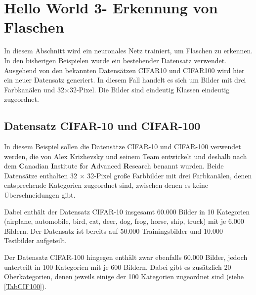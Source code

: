 %
%


\section{\glqq Hello World 3\grqq - Erkennung von Flaschen}\label{TrainFlaschen}

In diesem Abschnitt wird ein neuronales Netz trainiert, um Flaschen zu erkennen. In den bisherigen Beispielen wurde ein bestehender Datensatz verwendet. Ausgehend von den bekannten Datensätzen CIFAR10 und CIFAR100 wird hier ein neuer Datensatz generiert. In diesem Fall handelt es sich um Bilder mit drei Farbkanälen und 32$\times$32-Pixel. Die Bilder sind eindeutig Klassen eindeutig zugeordnet.  


\subsection{Datensatz CIFAR-10 und CIFAR-100}

In diesem Beispiel sollen die Datensätze CIFAR-10 und CIFAR-100 verwendet werden, die von Alex Krizhevsky und seinem Team entwickelt und deshalb nach dem \textbf{C}anadian \textbf{I}nstitute \textbf{f}or \textbf{A}dvanced \textbf{R}esearch benannt wurden. 
Beide Datensätze enthalten 32 $\times$ 32-Pixel große Farbbilder mit drei Farbkanälen, denen entsprechende Kategorien zugeordnet sind, zwischen denen es keine Überschneidungen gibt. \cite{Krizhevsky:2009}

Dabei enthält der Datensatz CIFAR-10 insgesamt 60.000 Bilder in 10 Kategorien (airplane, automobile, bird, cat, deer, dog, frog, horse, ship, truck) mit je 6.000 Bildern. Der Datensatz ist bereits auf 50.000 Trainingsbilder und 10.000 Testbilder aufgeteilt.

Der Datensatz CIFAR-100 hingegen enthält zwar ebenfalls 60.000 Bilder, jedoch unterteilt in 100 Kategorien mit je 600 Bildern. Dabei gibt es zusätzlich 20 Oberkategorien, 
denen jeweils einige der 100 Kategorien zugeordnet sind (siehe \ref{TabCIF100}).

